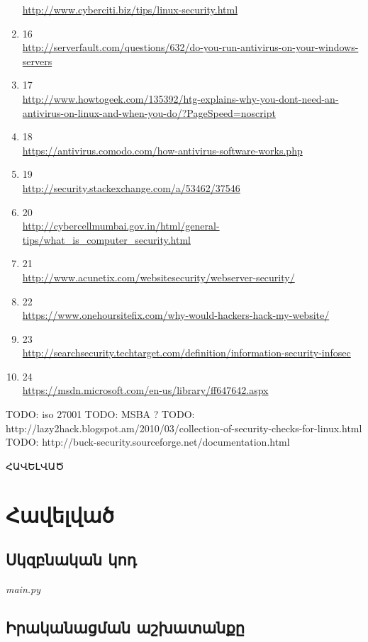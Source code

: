 \documentclass[11pt]{article}
\begin{document}
\begin{sloppypar}
\begin{enumerate}
	\url{http://www.cyberciti.biz/tips/linux-security.html}
\item 16 \\
	\url{http://serverfault.com/questions/632/do-you-run-antivirus-on-your-windows-servers}
\item 17 \\
	\url{http://www.howtogeek.com/135392/htg-explains-why-you-dont-need-an-antivirus-on-linux-and-when-you-do/?PageSpeed=noscript}
\item 18 \\
	\url{https://antivirus.comodo.com/how-antivirus-software-works.php}
\item 19 \\
	\url{http://security.stackexchange.com/a/53462/37546}
\item 20 \\
	\url{http://cybercellmumbai.gov.in/html/general-tips/what\_is\_computer\_security.html}
\item 21 \\
	\url{http://www.acunetix.com/websitesecurity/webserver-security/}
\item 22 \\
	\url{https://www.onehoursitefix.com/why-would-hackers-hack-my-website/}
\item 23 \\
	\url{http://searchsecurity.techtarget.com/definition/information-security-infosec}
\item 24 \\
	\url{https://msdn.microsoft.com/en-us/library/ff647642.aspx}
\end{enumerate}


TODO: iso 27001
TODO: MSBA ?
TODO: http://lazy2hack.blogspot.am/2010/03/collection-of-security-checks-for-linux.html
TODO: http://buck-security.sourceforge.net/documentation.html




\newpage
{}
\vspace*{\fill}
\begingroup
\centering
\centerline{\Huge{ՀԱՎԵԼՎԱԾ}}
\endgroup
\vspace*{\fill}
\newpage

\section*{Հավելված}
\subsection*{Սկզբնական կոդ}

\textit{main.py}
%

\newpage
\subsection*{Իրականացման աշխատանքը}

\end{sloppypar}
\end{document}
